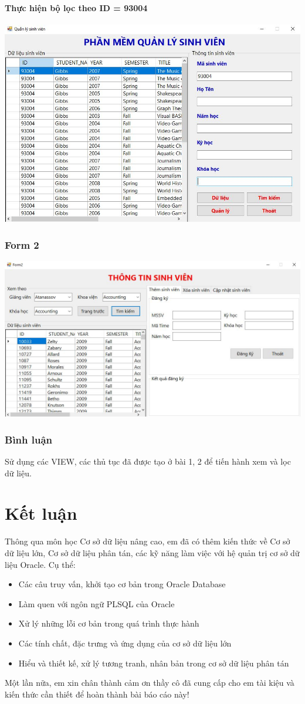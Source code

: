 \documentclass[12pt,a4paper]{report}
\begin{document}
\subsubsection{Thực hiện bộ lọc theo ID = 93004}
\includegraphics[scale=.65]{frm1}
\subsection{Form 2}
\includegraphics[scale=.56]{frm2}
\subsection{Bình luận}
Sử dụng các VIEW, các thủ tục đã được tạo ở bài 1, 2 để tiến hành xem và lọc dữ liệu.

\chapter*{Kết luận}
Thông qua môn học Cơ sở dữ liệu nâng cao, em đã có thêm kiến thức về Cơ sở dữ liệu lớn, Cơ sở dữ liệu phân tán, các kỹ năng làm việc với hệ quản trị cơ sở dữ liệu Oracle. Cụ thể:
\begin{itemize}
	\item Các câu truy vấn, khởi tạo cơ bản trong Oracle Database
	\item Làm quen với ngôn ngữ PLSQL của Oracle
	\item Xử lý những lỗi cơ bản trong quá trình thực hành
	\item Các tính chất, đặc trưng và ứng dụng của cơ sở dữ liệu lớn
	\item Hiểu và thiết kế, xử lý tương tranh, nhân bản trong cơ sở dữ liệu phân tán
\end{itemize}
Một lần nữa, em xin chân thành cảm ơn thầy cô đã cung cấp cho em tài kiệu và kiến thức cần thiết để hoàn thành bài báo cáo này!
\end{document}
